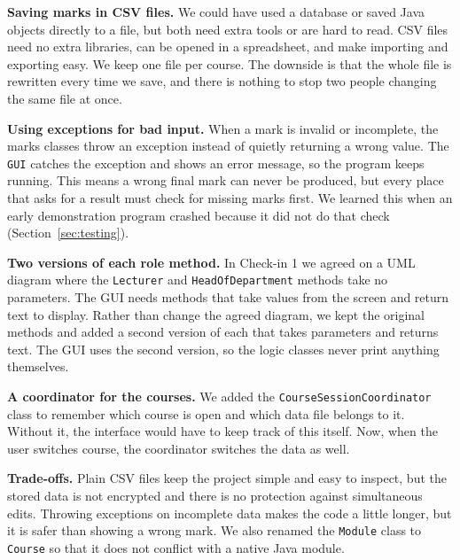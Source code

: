 \textbf{Saving marks in CSV files.} We could have used a database or saved Java objects directly to a file, but both need extra tools or are hard to read. CSV files need no extra libraries, can be opened in a spreadsheet, and make importing and exporting easy. We keep one file per course. The downside is that the whole file is rewritten every time we save, and there is nothing to stop two people changing the same file at once.

\textbf{Using exceptions for bad input.} When a mark is invalid or incomplete, the marks classes throw an exception instead of quietly returning a wrong value. The \texttt{GUI} catches the exception and shows an error message, so the program keeps running. This means a wrong final mark can never be produced, but every place that asks for a result must check for missing marks first. We learned this when an early demonstration program crashed because it did not do that check (Section~\ref{sec:testing}).

\textbf{Two versions of each role method.} In Check-in 1 we agreed on a UML diagram where the \texttt{Lecturer} and \texttt{HeadOfDepartment} methods take no parameters. The GUI needs methods that take values from the screen and return text to display. Rather than change the agreed diagram, we kept the original methods and added a second version of each that takes parameters and returns text. The GUI uses the second version, so the logic classes never print anything themselves.

\textbf{A coordinator for the courses.} We added the \texttt{CourseSessionCoordinator} class to remember which course is open and which data file belongs to it. Without it, the interface would have to keep track of this itself. Now, when the user switches course, the coordinator switches the data as well.

\textbf{Trade-offs.} Plain CSV files keep the project simple and easy to inspect, but the stored data is not encrypted and there is no protection against simultaneous edits. Throwing exceptions on incomplete data makes the code a little longer, but it is safer than showing a wrong mark. We also renamed the \texttt{Module} class to \texttt{Course} so that it does not conflict with a native Java module.